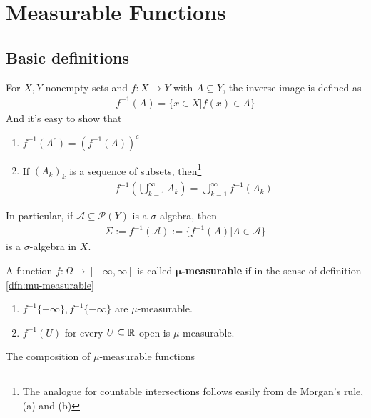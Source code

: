 \section{Measurable Functions}

\subsection{Basic definitions}
For $X,Y$ nonempty sets and $f: X \to  Y$ with $A \subseteq Y$, the inverse image is defined as
\begin{align*}
  f^{-1}(A) = \{x \in X \big\vert f(x)\in A\}
\end{align*}
And it's easy to show that 
\begin{enumerate}
  \item $f^{-1}(A^{c}) = \left(f^{-1}(A)\right)^{c}$
  \item If $(A_k)_{k}$ is a sequence of subsets, then\footnote{The analogue for countable intersections follows easily from de Morgan's rule, (a) and (b)}
    \begin{align*}
      f^{-1} \left(
        \bigcup_{k = 1}^{\infty}A_k
      \right)
      = \bigcup_{k=1}^{\infty}f^{-1}(A_k)
    \end{align*}
\end{enumerate}
In particular, if $\mathcal{A} \subseteq \mathcal{P}(Y)$ is a $\sigma$-algebra, then 
\begin{align*}
  \Sigma := f^{-1}(\mathcal{A}) := \{f^{-1}(A) \big\vert A \in \mathcal{A}\}
\end{align*}
is a $\sigma$-algebra in $X$.






\begin{dfn}[]
  A function $f: \Omega \to [-\infty,\infty]$ is called \textbf{$\bm{\mu}$-measurable} if in the sense of definition \ref{dfn:mu-measurable}
  \begin{enumerate}
    \item $f^{-1} \{+ \infty\}, f^{-1}\{-\infty\}$ are $\mu$-measurable.
    \item$f^{-1}(U)$ for every $U \subseteq \mathbb{R}$ open is $\mu$-measurable.
  \end{enumerate}
\end{dfn}
The composition of $\mu$-measurable functions
